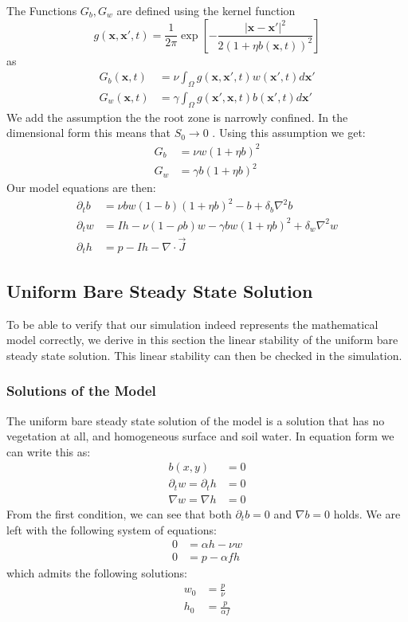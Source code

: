 \documentclass{article}
\numberwithin{equation}{section}
\begin{document}
The Functions $G_b,G_w$ are defined using the kernel function
\begin{equation}
    g(\mathbf{x}, \mathbf{x'},t) = \frac{1}{2\pi} \exp\left[-\frac{\left|\mathbf{x}-\mathbf{x'}\right|^2}{2(1+\eta b(\mathbf{x},t))^2}\right]
\end{equation} as \begin{align}
    G_b(\mathbf{x},t) &= \nu \int_\Omega g(\mathbf{x},\mathbf{x'},t)w(\mathbf{x'},t)d\mathbf{x'} \\
    G_w(\mathbf{x},t) &= \gamma \int_\Omega g(\mathbf{x'},\mathbf{x},t)b(\mathbf{x'},t)d\mathbf{x'}
\end{align}
We add the assumption the the root zone is narrowly confined. In the dimensional form this means that $S_0\rightarrow 0$ \parencite[see][eq (3)]{gilad_phys_2004}. Using this assumption we get:
\begin{align}
    G_b &= \nu w (1+\eta b)^2 \\
    G_w &= \gamma b(1+\eta b)^2
\end{align}
Our model equations are then:
\begin{align}
    \partial_t b &= \nu bw(1-b)(1+\eta b)^2 - b + \delta_b\nabla^2 b \\
    \partial_t w &= I h - \nu(1-\rho b)w - \gamma bw(1+\eta b)^2 + \delta_w \nabla^2 w \\
    \partial_t h &= p - I h - \nabla \cdot \vec{J}
\end{align}
\subsection{Uniform Bare Steady State Solution}
To be able to verify that our simulation indeed represents the mathematical model correctly, we derive in this section the linear stability of the uniform bare steady state solution. This linear stability can then be checked in the simulation.
\subsubsection{Solutions of the Model}
The uniform bare steady state solution of the model is a solution that has no vegetation at all, and homogeneous surface and soil water. In equation form we can write this as:
\begin{align}
    b(x,y)&=0 \\
    \partial_t w = \partial_t h &= 0 \\
    \nabla w = \nabla h &= 0
\end{align}
From the first condition, we can see that both $\partial_tb=0$ and $\nabla b=0$ holds. We are left with the following system of equations:
\begin{align}
    0 &= \alpha h - \nu w \\
    0 &= p-\alpha f h
\end{align}
which admits the following solutions:
\begin{align}
    w_0 &= \frac{p}{\nu} \\
    h_0 &= \frac{p}{\alpha f}
\end{align}
\end{document}
